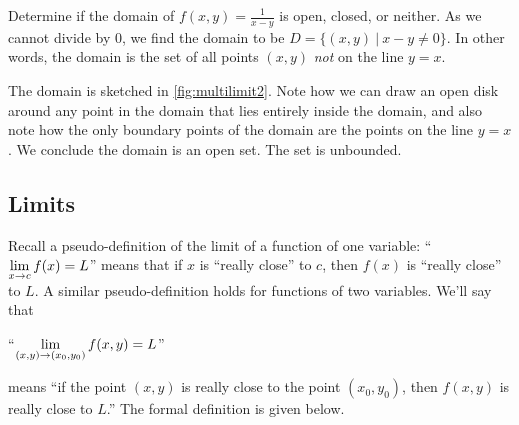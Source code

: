 \begin{example}\label{ex_multilimit2}%
Determine if the domain of $f(x,y) = \frac1{x-y}$ is open, closed, or neither.
\solution
As we cannot divide by 0, we find the domain to be $D = \{(x,y)\ |\ x-y\neq 0\}$. In other words, the domain is the set of all points $(x,y)$ \emph{not} on the line $y=x$. 

The domain is sketched in \autoref{fig:multilimit2}. Note how we can draw an open disk around any point in the domain that lies entirely inside the domain, and also note how the only boundary points of the domain are the points on the line $y=x$. We conclude the domain is an open set. The set is unbounded.
\end{example}


\subsection{Limits}

Recall a pseudo-definition of the limit of a function of one variable: ``$\displaystyle \lim_{x\to c}f(x) = L$'' means that if $x$ is ``really close'' to $c$, then $f(x)$ is ``really close'' to $L$. A similar pseudo-definition holds for functions of two variables. We'll say that
\begin{center}
``\!$\displaystyle \lim_{(x,y)\to (x_0,y_0)} f(x,y) = L$''
\end{center}
means ``if the point $(x,y)$ is really close to the point $(x_0,y_0)$, then $f(x,y)$ is really close to $L$.'' The formal definition is given below.

